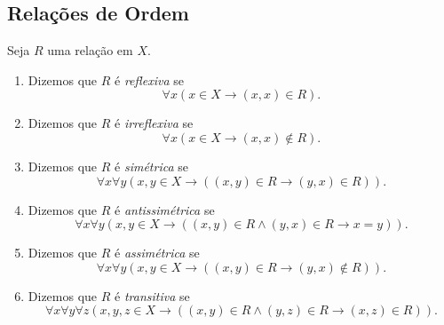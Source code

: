 \subsection{Relações de Ordem}

\begin{definition}
    Seja $R$ uma relação em $X$.
        \begin{enumerate}[leftmargin=*, align=left, label=\textbf{(\alph*)}]
            \item Dizemos que $R$ é \emph{reflexiva} se
                \[
                    \forall x (x \in X \rightarrow (x,x) \in R).
                \]
            \item Dizemos que $R$ é \emph{irreflexiva} se
                \[
                    \forall x (x \in X \rightarrow (x,x) \notin R).
                \]
            \item Dizemos que $R$ é \emph{simétrica} se
                \[
                    \forall x \forall y (x,y \in X \rightarrow ((x,y) \in R \rightarrow (y,x) \in R)).
                \]
            \item Dizemos que $R$ é \emph{antissimétrica} se
                \[
                    \forall x \forall y (x,y \in X \rightarrow ((x,y) \in R \land (y,x) \in R \rightarrow x=y)).
                \]
            \item Dizemos que $R$ é \emph{assimétrica} se
                \[
                    \forall x \forall y (x,y \in X \rightarrow ( (x,y) \in R \rightarrow (y,x) \notin R)).
                \]
            \item Dizemos que $R$ é \emph{transitiva} se
                \[
                    \forall x \forall y \forall z (x,y,z \in X \rightarrow ((x,y) \in R \land (y,z) \in R \rightarrow (x,z) \in R)).
                \]
        \end{enumerate}
\end{definition}

